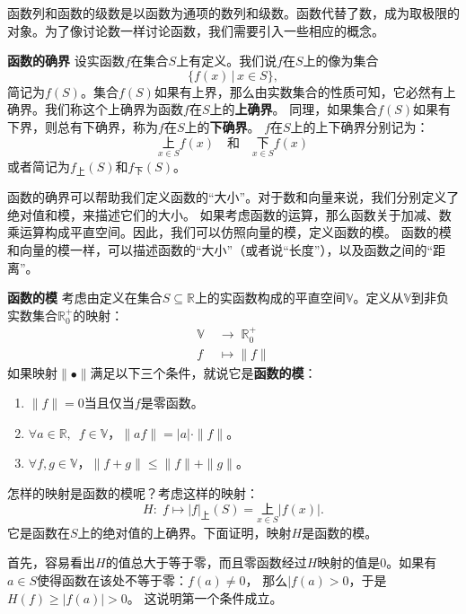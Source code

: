 \documentclass[12pt,UTF8]{ctexbook}
\begin{document}
\begin{appendix}
函数列和函数的级数是以函数为通项的数列和级数。函数代替了数，成为取极限的对象。为了像讨论数一样讨论函数，我们需要引入一些相应的概念。

\begin{df}{\textbf{函数的确界}}
    设实函数$f$在集合$S$上有定义。我们说$f$在$S$上的像为集合
    $$ \{f(x) \,|\, x\in S\}, $$
    简记为$f(S)$。集合$f(S)$如果有上界，那么由实数集合的性质可知，它必然有上确界。我们称这个上确界为函数$f$在$S$上的\textbf{上确界}。
    同理，如果集合$f(S)$如果有下界，则总有下确界，称为$f$在$S$上的\textbf{下确界}。
    $f$在$S$上的上下确界分别记为：
    $$ \underset{x\in S}{\text{上}} f(x) \quad \mbox{和} \quad \underset{x\in S}{\text{下}} f(x)$$
    或者简记为$f_{\text{上}}(S)$和$f_{\text{下}}(S)$。
\end{df}

函数的确界可以帮助我们定义函数的“大小”。对于数和向量来说，我们分别定义了绝对值和模，来描述它们的大小。
如果考虑函数的运算，那么函数关于加减、数乘运算构成平直空间。因此，我们可以仿照向量的模，定义函数的模。
函数的模和向量的模一样，可以描述函数的“大小”（或者说“长度”），以及函数之间的“距离”。
\begin{df}{\textbf{函数的模}}
    考虑由定义在集合$S\subseteq\mathbb{R}$上的实函数构成的平直空间$\mathbb{V}$。定义从$\mathbb{V}$到非负实数集合$\mathbb{R}_0^+$的映射：
    \begin{align*}
        \mathbb{V} \; &\rightarrow  \; \mathbb{R}_0^+ \\
        f &\mapsto \|f\|
    \end{align*}
    如果映射$\|\bullet \|$满足以下三个条件，就说它是\textbf{函数的模}：
    \begin{enumerate}
        \item $\|f\| = 0$当且仅当$f$是零函数。
        \item $\forall a\in\mathbb{R},\,\,\,f \in \mathbb{V}$，$\|af\| = |a| \cdot \|f\|$。
        \item $\forall f,g \in \mathbb{V}$，$\|f + g\| \leqslant \|f\| + \|g\|$。
    \end{enumerate}
\end{df}

怎样的映射是函数的模呢？考虑这样的映射：
$$ H:\; f \mapsto |f|_{\text{上}}(S) = \underset{x\in S}{\text{上}} |f(x)|. $$
它是函数在$S$上的绝对值的上确界。下面证明，映射$H$是函数的模。

首先，容易看出$H$的值总大于等于零，而且零函数经过$H$映射的值是$0$。如果有$a\in S$使得函数在该处不等于零：$f(a)\neq 0$，
那么$|f(a)>0$，于是$H(f) \geqslant |f(a)| > 0$。
这说明第一个条件成立。


\end{appendix}
\end{document}
